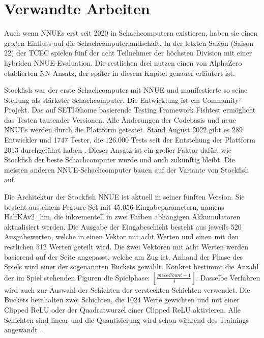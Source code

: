 \chapter{Verwandte Arbeiten}
\label{chap:relatedWork}

Auch wenn \acp{NNUE} erst seit 2020 in Schachcomputern existieren, haben sie einen großen Einfluss auf die Schachcomputerlandschaft. In der letzten Saison (Saison 22) der \ac{TCEC} \cite{TCEC22} spielen fünf der acht Teilnehmer der höchsten Division mit einer hybriden \ac{NNUE}-Evaluation. Die restlichen drei nutzen einen von AlphaZero etablierten \ac{NN} Ansatz, der später in diesem Kapitel genauer erläutert ist.


Stockfish war der erste Schachcomputer mit \ac{NNUE} und manifestierte so seine Stellung als stärkster Schachcomputer. Die Entwicklung ist ein Community-Projekt. Das auf SETI@home \cite{SETI2001} basierende Testing Framework Fishtest ermöglicht das Testen tausender Versionen. Alle Änderungen der Codebasis und neue \acp{NNUE} werden durch die Plattform getestet. Stand August 2022 gibt es 289 Entwickler und 1747 Tester, die 126.000 Tests seit der Entstehung der Plattform 2013 durchgeführt haben \cite{FishtestUsers}. Dieser Ansatz ist ein großer Faktor dafür, wie Stockfish der beste Schachcomputer wurde und auch zukünftig bleibt. Die meisten anderen \ac{NNUE}-Schachcomputer bauen auf der Variante von Stockfish auf.
 
Die Architektur der Stockfish \ac{NNUE} ist aktuell in seiner fünften Version. Sie besteht aus einem Feature Set mit 45.056 Eingabeparametern, namens HalfKAv2\_hm, die inkrementell in zwei Farben abhängigen Akkumulatoren aktualisiert werden. Die Ausgabe der Eingabeschicht besteht aus jeweils 520 Ausgabewerten, welche in einen Vektor mit acht Werten und einen mit den restlichen 512 Werten geteilt wird. Die zwei Vektoren mit acht Werten werden basierend auf der Seite angepasst, welche am Zug ist. Anhand der Phase des Spiels wird einer der sogenannten Buckets gewählt. Konkret bestimmt die Anzahl der im Spiel stehenden Figuren die Spielphase: $\left \lfloor\frac{pieceCount-1}{4}\right \rfloor$. Dasselbe Verfahren wird auch zur Auswahl der Schichten der versteckten Schichten verwendet. Die Buckets beinhalten zwei Schichten, die 1024 Werte gewichten und mit einer Clipped \ac{ReLU} oder der Quadratwurzel einer Clipped \ac{ReLU} aktivieren. Alle Schichten sind linear und die Quantisierung wird schon während des Trainings angewandt \cite{StockfishNNUE}.

